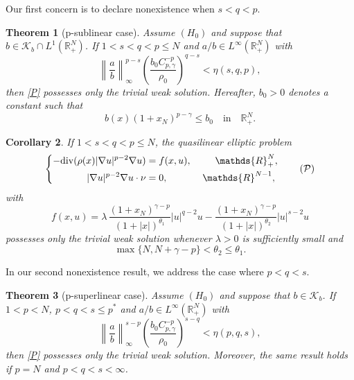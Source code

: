 \documentclass[12pt,reqno]{amsart}
\newtheorem{theorem}{Theorem}[section]
\newtheorem{corollary}[theorem]{Corollary}
\begin{document}
Our first concern is to declare nonexistence when $s<q<p$.

\begin{theorem}[p-sublinear case]\label{nonexistence1} 
 Assume $(H_0)$ and suppose that $b\in \mathcal{K}_b\cap L^1(\mathds{R}^N_+)$. If $1< s<q<p\leq N$ and $a/b\in L^\infty(\mathds{R}^N_+)$ with 
		\begin{equation}\label{condition for nonexistence}
			\left\|\frac{a}{b}\right\|_{\infty}^{p-s}	\left(\frac{b_0C_{p,\gamma}^{-p}}{\rho_0}\right)^{q-s}<\eta(s,q,p),
		\end{equation}
then \eqref{P} possesses only the trivial weak solution. Hereafter, $b_0>0$ denotes a constant such that 
$$
b(x)(1+x_N)^{p-\gamma}\leq b_0\quad\mbox{in}\quad\mathds{R}^N_+.
$$
\end{theorem}


\begin{corollary} If $1< s<q<p\leq N$, the quasilinear elliptic problem 	\begin{equation}\label{P}
		\left\lbrace
		\begin{aligned}
			-\mathrm{div}(\rho(x)|\nabla u|^{p-2}\nabla u ) &=f(x,u),\; &\mathds{R}^N_+&,
			\vspace{0.2cm}\\
			|\nabla u|^{p-2}\nabla u\cdot\nu&=0,\; &\mathds{R}^{N-1},
		\end{aligned}
		\right.
		\tag{$\mathcal{P}$}
	\end{equation} 
with 
\begin{equation*}
f(x,u)=    \lambda \, \frac{(1+x_N)^{\gamma-p}}{(1+|x|)^{\theta_1}}|u|^{q-2}u-\frac{(1+x_N)^{\gamma-p}}{(1+|x|)^{\theta_2}}|u|^{s-2}u
\end{equation*}
possesses only the trivial weak solution whenever $\lambda>0$ is sufficiently small and
\begin{equation*}
    \max\{N,N+\gamma-p\}<\theta_2\leq \theta_1 .
\end{equation*}
\end{corollary}
 

In our second nonexistence result, we address the case where 
$p<q<s$.

 \begin{theorem}[p-superlinear case]\label{nonexistence2} 
Assume $(H_0)$ and suppose that $b\in \mathcal{K}_b$. If $1<p<N$, $p<q<s\leq p^*$ and $a/b\in L^\infty(\mathds{R}^N_+)$ with
 \begin{equation}\label{condition for nonexistence 2}
			 \left\|\frac{a}{b}\right\|_{\infty}^{s-p}	\left(\frac{b_0C_{p,\gamma}^{-p}}{\rho_0}\right)^{s-q}<\eta(p,q,s),
		\end{equation}
then \eqref{P} possesses only the trivial weak solution. Moreover, the same result holds if $p=N$ and $p<q<s<\infty$. 
	\end{theorem}
\end{document}
